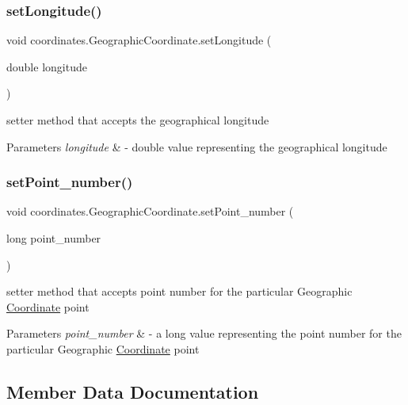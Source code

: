 \subsubsection{\texorpdfstring{set\+Longitude()}{setLongitude()}}
{\footnotesize\ttfamily void coordinates.\+Geographic\+Coordinate.\+set\+Longitude (\begin{DoxyParamCaption}\item[{double}]{longitude }\end{DoxyParamCaption})}



setter method that accepts the geographical longitude 


\begin{DoxyParams}{Parameters}
{\em longitude} & -\/ double value representing the geographical longitude \\
\hline
\end{DoxyParams}
\mbox{\label{classcoordinates_1_1_geographic_coordinate_a60674b3195f4470485e62005e90eb141}} 
\subsubsection{\texorpdfstring{set\+Point\+\_\+number()}{setPoint\_number()}}
{\footnotesize\ttfamily void coordinates.\+Geographic\+Coordinate.\+set\+Point\+\_\+number (\begin{DoxyParamCaption}\item[{long}]{point\+\_\+number }\end{DoxyParamCaption})}



setter method that accepts point number for the particular Geographic \hyperlink{classcoordinates_1_1_coordinate}{Coordinate} point 


\begin{DoxyParams}{Parameters}
{\em point\+\_\+number} & -\/ a long value representing the point number for the particular Geographic \hyperlink{classcoordinates_1_1_coordinate}{Coordinate} point \\
\hline
\end{DoxyParams}


\subsection{Member Data Documentation}
\mbox{\label{classcoordinates_1_1_geographic_coordinate_ab14ea3abf8e94174e4eff69ab983282e}} 
